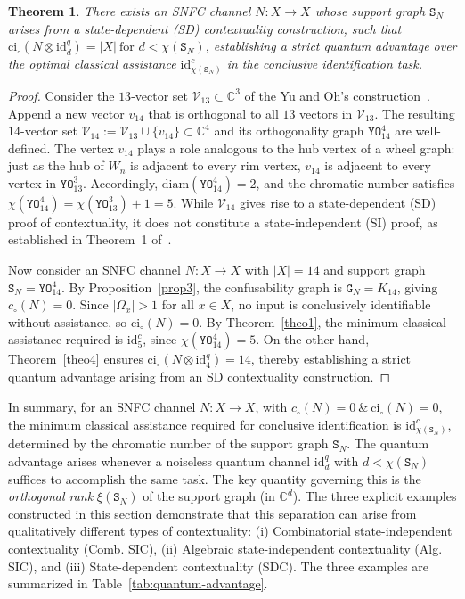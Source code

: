\documentclass[12pt,a4paper]{article}
\newtheorem{theorem}{Theorem}
\begin{document}
\begin{theorem}\label{theo7}
There exists an SNFC channel $N : X \to X$ whose support graph $\mathtt{S}_N$ arises from a state-dependent (SD) contextuality construction, such that $\mathrm{ci}_\circ(N \otimes \mathrm{id}^q_d) = |X|~\text{for~} d < \chi(\mathtt{S}_N)$, establishing a strict quantum advantage over the optimal classical assistance $\mathrm{id}^c_{\chi(\mathtt{S}_N)}$ in the conclusive identification task.
\end{theorem}
\begin{proof}
Consider the $13$-vector set $\mathcal{V}_{13} \subset\mathbb{C}^3$ of the Yu and Oh's construction~\cite{Yu2012}. Append a new vector $v_{14}$ that is orthogonal to all $13$ vectors in $\mathcal{V}_{13}$. The resulting $14$-vector set $\mathcal{V}_{14} := \mathcal{V}_{13} \cup \{v_{14}\} \subset \mathbb{C}^4$ and its orthogonality graph $\mathtt{YO}^4_{14}$ are well-defined. The vertex $v_{14}$ plays a role analogous to the hub vertex of a wheel graph: just as the hub of $W_n$ is adjacent to every rim vertex, $v_{14}$ is adjacent to every vertex in $\mathtt{YO}^3_{13}$. Accordingly, $\mathrm{diam}(\mathtt{YO}^4_{14})=2$, and the chromatic number satisfies $\chi(\mathtt{YO}^4_{14}) = \chi(\mathtt{YO}^3_{13}) + 1 = 5$. While $\mathcal{V}_{14}$ gives rise to a state-dependent (SD) proof of contextuality, it does not constitute a state-independent (SI) proof, as established in Theorem~1 of~\cite{Cabello2015}.

\noindent Now consider an SNFC channel $N : X \to X$ with $|X| = 14$ and support graph $\mathtt{S}_N =\mathtt{YO}^4_{14}$. By Proposition~\ref{prop3}, the confusability graph is $\mathtt{G}_N = K_{14}$, giving $c_\circ(N) = 0$. Since $|\Omega_x| > 1$ for all $x \in X$, no input is conclusively identifiable without assistance, so $\mathrm{ci}_\circ(N) = 0$. By Theorem~\ref{theo1}, the minimum classical assistance required is $\mathrm{id}^c_5$, since $\chi(\mathtt{YO}^4_{14}) = 5$. On the other hand, Theorem~\ref{theo4} ensures $\mathrm{ci}_\circ(N \otimes \mathrm{id}^q_4)= 14$, thereby establishing a strict quantum advantage arising from an SD contextuality construction.
\end{proof}

\noindent In summary, for an SNFC channel $N : X \to X$, with $c_\circ(N)=0~\&~\mathrm{ci}_\circ(N)=0$, the minimum classical assistance required for conclusive identification is $\mathrm{id}^c_{\chi(\mathtt{S}_N)}$, determined by the chromatic number of the support graph $\mathtt{S}_N$. The quantum advantage arises whenever a noiseless quantum channel $\mathrm{id}^q_d$ with $d < \chi(\mathtt{S}_N)$ suffices to accomplish the same task. The key quantity governing this is the \emph{orthogonal rank} $\xi(\mathtt{S}_N)$ of the support graph (in $\mathbb{C}^d$). The three explicit examples constructed in this section demonstrate that this separation can arise from qualitatively different types of contextuality: (i) Combinatorial state-independent contextuality (Comb. SIC), (ii) Algebraic state-independent contextuality (Alg. SIC), and (iii) State-dependent contextuality (SDC). The three examples are summarized in Table~\ref{tab:quantum-advantage}.
\end{document}

